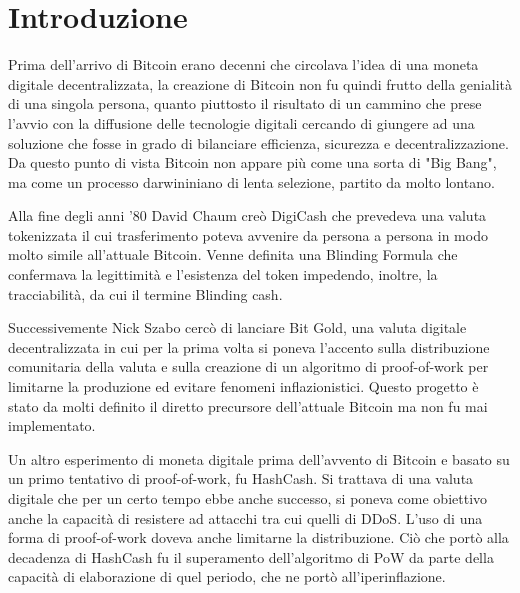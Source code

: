 
\cleardoublepage
{}

\chapter{Introduzione}
Prima dell'arrivo di Bitcoin erano decenni che circolava l'idea di una moneta digitale decentralizzata, la creazione di Bitcoin non fu quindi frutto della genialità di una singola persona, quanto piuttosto il risultato di un cammino che prese l'avvio con la diffusione delle tecnologie digitali cercando di giungere ad una soluzione che fosse in grado di bilanciare efficienza, sicurezza e decentralizzazione. Da questo punto di vista Bitcoin non appare più come una sorta di "Big Bang", ma come un processo darwininiano di lenta selezione, partito da molto lontano. 

Alla fine degli anni '80 David Chaum creò DigiCash che prevedeva una valuta tokenizzata il cui trasferimento poteva avvenire da persona a persona in modo molto simile all'attuale Bitcoin. Venne definita una Blinding Formula che confermava la legittimità e l'esistenza del token impedendo, inoltre, la tracciabilità, da cui il termine Blinding cash. 

Successivemente Nick Szabo cercò di lanciare Bit Gold, una valuta digitale decentralizzata in cui per la prima volta si poneva l'accento sulla distribuzione comunitaria della valuta e sulla creazione di un algoritmo di proof-of-work per limitarne la produzione ed evitare fenomeni inflazionistici. Questo progetto è stato da molti definito il diretto precursore dell'attuale Bitcoin ma non fu mai implementato.

Un altro esperimento di moneta digitale prima dell'avvento di Bitcoin e basato su un primo tentativo di proof-of-work, fu HashCash. Si trattava di una valuta digitale che per un certo tempo ebbe anche successo, si poneva come obiettivo anche la capacità di resistere ad attacchi tra cui quelli di DDoS. L'uso di una forma di proof-of-work doveva anche limitarne la distribuzione. Ciò che portò alla decadenza di HashCash fu il superamento dell'algoritmo di PoW da parte della capacità di elaborazione di quel periodo, che ne portò all'iperinflazione.

